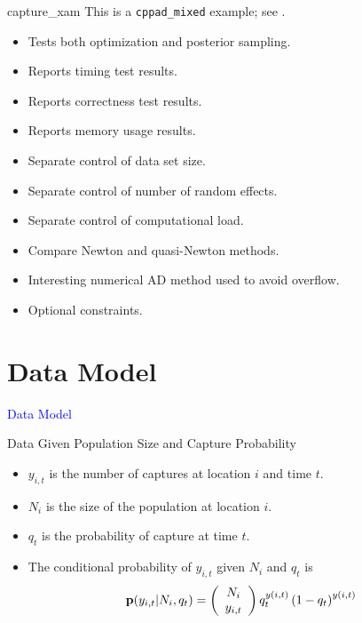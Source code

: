 \documentclass{beamer}
\newcommand{\Blue}[1]{\textcolor{blue}{#1}}
\newcommand{\B}[1]{{\bf #1}}
\newcommand{\Section}[1]{
    \section{#1}
    \begin{frame}
    \begin{center}
    \Blue{ \Large{#1} }
    \end{center}
    \end{frame}
}
\begin{document}
\begin{frame}{capture\_xam}
This is a \texttt{cppad\_mixed} example; see  \cite{Royle2004}.
\pause

\begin{itemize}

\item
Tests both optimization and posterior sampling.
\pause

\item
Reports timing test results.
\pause

\item
Reports correctness test results.
\pause

\item
Reports memory usage results.
\pause

\item
Separate control of data set size.
\pause

\item
Separate control of number of random effects.
\pause

\item
Separate control of computational load.
\pause

\item
Compare Newton and quasi-Newton methods.
\pause

\item
Interesting numerical AD method used to avoid overflow.
\pause

\item
Optional constraints.

\end{itemize}
\end{frame}

\Section{Data Model}

\begin{frame}{Data Given Population Size and Capture Probability}
\begin{itemize}

\item
$y_{i,t}$ is the number of captures at location $i$ and time $t$.
\pause

\item
$N_i$ is the size of the population at location $i$.
\pause

\item
$q_t$ is the probability of capture at time $t$.
\pause

\item
The conditional probability of $y_{i,t}$ given $N_i$ and $q_t$ is
\[
\B{p} ( y_{i,t} | N_i , q_t )
=
\left( \begin{array}{c} N_i \\ y_{i,t} \end{array} \right)
q_t^{y(i,t)} \left( 1 - q_t\right)^{y(i,t)}
\]

\end{itemize}
\end{frame}
\end{document}
